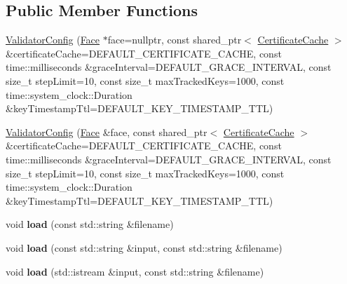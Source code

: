 \subsection*{Public Member Functions}
\begin{DoxyCompactItemize}
\item 
\hyperlink{classndn_1_1ValidatorConfig_a05768a28c6a5516c18795fb63719cf67}{Validator\+Config} (\hyperlink{classndn_1_1Face}{Face} $\ast$face=nullptr, const shared\+\_\+ptr$<$ \hyperlink{classndn_1_1CertificateCache}{Certificate\+Cache} $>$ \&certificate\+Cache=D\+E\+F\+A\+U\+L\+T\+\_\+\+C\+E\+R\+T\+I\+F\+I\+C\+A\+T\+E\+\_\+\+C\+A\+C\+HE, const time\+::milliseconds \&grace\+Interval=D\+E\+F\+A\+U\+L\+T\+\_\+\+G\+R\+A\+C\+E\+\_\+\+I\+N\+T\+E\+R\+V\+AL, const size\+\_\+t step\+Limit=10, const size\+\_\+t max\+Tracked\+Keys=1000, const time\+::system\+\_\+clock\+::\+Duration \&key\+Timestamp\+Ttl=D\+E\+F\+A\+U\+L\+T\+\_\+\+K\+E\+Y\+\_\+\+T\+I\+M\+E\+S\+T\+A\+M\+P\+\_\+\+T\+TL)
\item 
\hyperlink{classndn_1_1ValidatorConfig_a85e10fe38484c0fe76e618a81dfb2b92}{Validator\+Config} (\hyperlink{classndn_1_1Face}{Face} \&face, const shared\+\_\+ptr$<$ \hyperlink{classndn_1_1CertificateCache}{Certificate\+Cache} $>$ \&certificate\+Cache=D\+E\+F\+A\+U\+L\+T\+\_\+\+C\+E\+R\+T\+I\+F\+I\+C\+A\+T\+E\+\_\+\+C\+A\+C\+HE, const time\+::milliseconds \&grace\+Interval=D\+E\+F\+A\+U\+L\+T\+\_\+\+G\+R\+A\+C\+E\+\_\+\+I\+N\+T\+E\+R\+V\+AL, const size\+\_\+t step\+Limit=10, const size\+\_\+t max\+Tracked\+Keys=1000, const time\+::system\+\_\+clock\+::\+Duration \&key\+Timestamp\+Ttl=D\+E\+F\+A\+U\+L\+T\+\_\+\+K\+E\+Y\+\_\+\+T\+I\+M\+E\+S\+T\+A\+M\+P\+\_\+\+T\+TL)
\item 
void {\bfseries load} (const std\+::string \&filename)\hypertarget{classndn_1_1ValidatorConfig_a9f104ff718c1cade370709402a479e9b}{}\label{classndn_1_1ValidatorConfig_a9f104ff718c1cade370709402a479e9b}

\item 
void {\bfseries load} (const std\+::string \&input, const std\+::string \&filename)\hypertarget{classndn_1_1ValidatorConfig_ab05112be21dcb58475ab693d726340f4}{}\label{classndn_1_1ValidatorConfig_ab05112be21dcb58475ab693d726340f4}

\item 
void {\bfseries load} (std\+::istream \&input, const std\+::string \&filename)\hypertarget{classndn_1_1ValidatorConfig_a3836fe2a0abfd47ee990ab4d5ab040c8}{}\label{classndn_1_1ValidatorConfig_a3836fe2a0abfd47ee990ab4d5ab040c8}


\end{DoxyCompactItemize}
